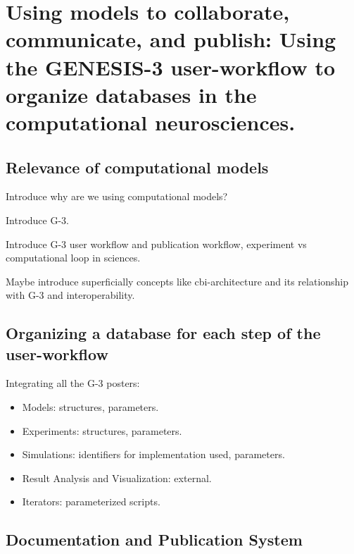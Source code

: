 \documentclass[12pt]{article}
\begin{document}


\section*{Using models to collaborate, communicate, and publish:  Using the GENESIS-3 user-workflow to organize databases in the computational neurosciences.}

\subsection*{Relevance of computational models}

Introduce why are we using computational models?

Introduce G-3.

Introduce G-3 user workflow and publication workflow, experiment vs
computational loop in sciences.

Maybe introduce superficially concepts like cbi-architecture and its
relationship with G-3 and interoperability.


\subsection*{Organizing a database for each step of the user-workflow}

Integrating all the G-3 posters:
\begin{itemize}
\item Models: structures, parameters.
\item Experiments: structures, parameters.
\item Simulations: identifiers for implementation used, parameters.
\item Result Analysis and Visualization: external.
\item Iterators: parameterized scripts.
\end{itemize}

\subsection*{Documentation and Publication System}
\end{document}
